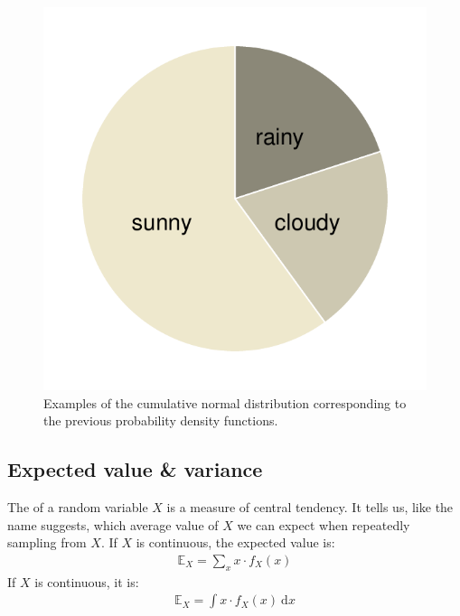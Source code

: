 \documentclass[nobib,nofonts]{tufte-handout}
\newcommand{\mult}{\ensuremath{\cdot}}
\begin{document}
\begin{example}
\begin{figure}
  \centering
  \includegraphics[width=\textwidth]{00-pics/05_01_normal-distribution-cumulative.pdf}
  \caption{Examples of the cumulative normal distribution corresponding to the previous probability
    density functions.}
  \label{fig:NormalDistributionCumulative}
\end{figure}

\end{example}

\subsection{Expected value \& variance}

The  of a random variable $X$ is a measure of central tendency. It
tells us, like the name suggests, which average value of $X$ we can expect when repeatedly
sampling from $X$. If $X$ is continuous, the expected value is:
\begin{align*}
  \mathds{E}_X = \sum_{x} x \mult f_X(x)
\end{align*}
If $X$ is continuous, it is:
\begin{align*}
  \mathds{E}_X = \int x \mult f_X(x) \ \text{d}x
\end{align*}
\end{document}
